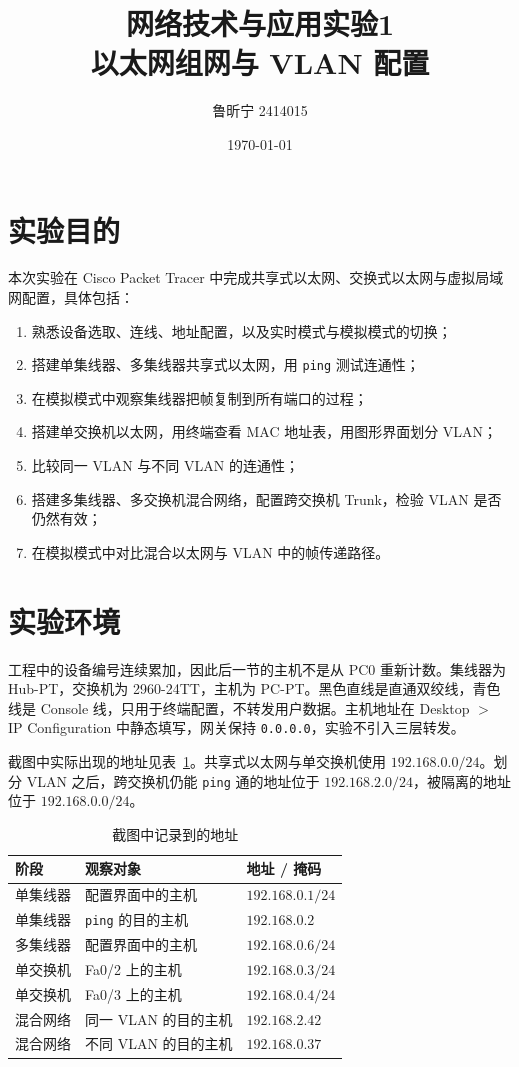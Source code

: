 \documentclass[10.5pt,a4paper,UTF8]{article}
\title{网络技术与应用实验1\\以太网组网与 VLAN 配置}
\author{鲁昕宁 2414015}
\date{\today}
\begin{document}
\begin{titlepage}
\maketitle
\end{titlepage}

\section{实验目的}
本次实验在 Cisco Packet Tracer 中完成共享式以太网、交换式以太网与虚拟局域网配置，具体包括：
\begin{enumerate}[leftmargin=2em]
    \item 熟悉设备选取、连线、地址配置，以及实时模式与模拟模式的切换；
    \item 搭建单集线器、多集线器共享式以太网，用 \texttt{ping} 测试连通性；
    \item 在模拟模式中观察集线器把帧复制到所有端口的过程；
    \item 搭建单交换机以太网，用终端查看 MAC 地址表，用图形界面划分 VLAN；
    \item 比较同一 VLAN 与不同 VLAN 的连通性；
    \item 搭建多集线器、多交换机混合网络，配置跨交换机 Trunk，检验 VLAN 是否仍然有效；
    \item 在模拟模式中对比混合以太网与 VLAN 中的帧传递路径。
\end{enumerate}

\section{实验环境}
工程中的设备编号连续累加，因此后一节的主机不是从 PC0 重新计数。集线器为 Hub-PT，交换机为 2960-24TT，主机为 PC-PT。黑色直线是直通双绞线，青色线是 Console 线，只用于终端配置，不转发用户数据。主机地址在 Desktop $>$ IP Configuration 中静态填写，网关保持 \texttt{0.0.0.0}，实验不引入三层转发。

截图中实际出现的地址见表~\ref{tab:plan}。共享式以太网与单交换机使用 $192.168.0.0/24$。划分 VLAN 之后，跨交换机仍能 \texttt{ping} 通的地址位于 $192.168.2.0/24$，被隔离的地址位于 $192.168.0.0/24$。

\begin{table}[htbp]
\centering
\caption{截图中记录到的地址}
\label{tab:plan}
\begin{tabular}{lll}
\toprule
阶段 & 观察对象 & 地址 / 掩码 \\
\midrule
单集线器 & 配置界面中的主机 & $192.168.0.1/24$ \\
单集线器 & \texttt{ping} 的目的主机 & $192.168.0.2$ \\
多集线器 & 配置界面中的主机 & $192.168.0.6/24$ \\
单交换机 & Fa0/2 上的主机 & $192.168.0.3/24$ \\
单交换机 & Fa0/3 上的主机 & $192.168.0.4/24$ \\
混合网络 & 同一 VLAN 的目的主机 & $192.168.2.42$ \\
混合网络 & 不同 VLAN 的目的主机 & $192.168.0.37$ \\
\bottomrule
\end{tabular}
\end{table}
\end{document}
